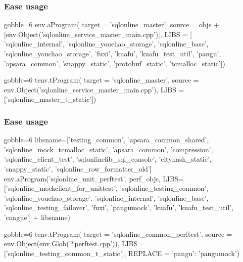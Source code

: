 \documentclass[lualatex]{beamer}
\begin{document}
\begin{frame}[fragile]
  \frametitle{Ease usage}

  \begin{block}{3.6}
    \begin{py*}{gobble=6}
      env.aProgram(
        target = 'sqlonline_master', 
        source = objs + [env.Object('sqlonline_service_master_main.cpp')], 
        LIBS = [
          'sqlonline_internal', 'sqlonline_youchao_storage', 'sqlonline_base',
          'sqlonline_youchao_storage', 'fuxi', 'kuafu', 'kuafu_test_util', 'pangu', 
          'apsara_common', 'snappy_static',  'protobuf_static', 'tcmalloc_static'])
    \end{py*}
  \end{block}

  \begin{block}{3.7}
    \begin{py*}{gobble=6}
      tenv.tProgram(
        target = 'sqlonline_master', 
        source = env.Object('sqlonline_service_master_main.cpp'), 
        LIBS = ['sqlonline_master_t_static'])
    \end{py*}
  \end{block}
\end{frame}

\begin{frame}[fragile]
  \frametitle{Ease usage}

  \begin{block}{3.6}
    \begin{py*}{gobble=6}
      libsname=['testing_common', 'apsara_common_shared',
        'sqlonline_mock_tcmalloc_static', 'apsara_common', 'compression', 
        'sqlonline_client_test', 'sqlonlinelib_sql_console',
        'cityhash_static',
        'snappy_static', 'sqlonline_row_formatter_old']
      env.aProgram('sqlonline_unit_perftest', perf_objs,
        LIBS=['sqlonline_mockclient_for_unittest', 'sqlonline_testing_common', 
              'sqlonline_youchao_storage', 'sqlonline_internal', 
              'sqlonline_base', 'sqlonline_testing_failover',
              'fuxi', 'pangumock', 'kuafu', 'kuafu_test_util', 'cangjie'] + libsname)
    \end{py*}
  \end{block}

  \begin{block}{3.7}
    \begin{py*}{gobble=6}
      tenv.tProgram(
        target = 'sqlonline_common_perftest',
        source = env.Object(env.Glob('*perftest.cpp')),
        LIBS = ['sqlonline_testing_common_t_static'],
        REPLACE = {'pangu': 'pangumock'})
    \end{py*}
  \end{block}
\end{frame}
\end{document}
